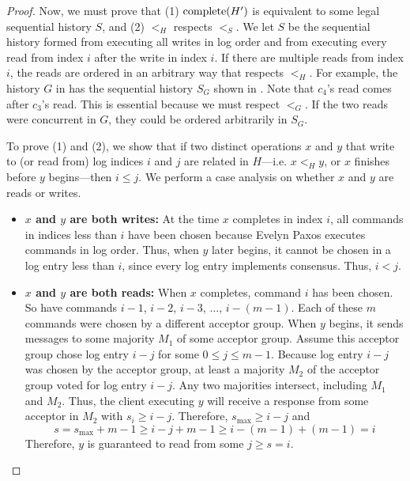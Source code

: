 \begin{proof}
  Now, we must prove that (1) $\text{complete}(H')$ is equivalent to some legal
  sequential history $S$, and (2) $<_H$ respects $<_S$. We let $S$ be the
  sequential history formed from executing all writes in log order and from
  executing every read from index $i$ after the write in index $i$.
  If there are multiple reads from index $i$, the reads are ordered in an
  arbitrary way that respects $<_H$. For example, the history $G$ in
   has the sequential history $S_G$ shown in
  . Note that $c_4$'s read comes after $c_3$'s read. This is
  essential because we must respect $<_G$. If the two reads were concurrent in
  $G$, they could be ordered arbitrarily in $S_G$.

  {}

  To prove (1) and (2), we show that if two distinct operations $x$ and $y$
  that write to (or read from) log indices $i$ and $j$ are related in
  $H$---i.e. $x <_H y$, or $x$ finishes before $y$ begins---then $i \leq j$. We
  perform a case analysis on whether $x$ and $y$ are reads or writes.

  \begin{itemize}
    \item \textbf{$x$ and $y$ are both writes:}
      At the time $x$ completes in index $i$, all commands in indices less than
      $i$ have been chosen because Evelyn Paxos executes commands in log order.
      Thus, when $y$ later begins, it cannot be chosen in a log entry less than
      $i$, since every log entry implements consensus. Thus, $i < j$.

    \item \textbf{$x$ and $y$ are both reads:}
      When $x$ completes, command $i$ has been chosen. So have commands $i-1$,
      $i-2$, $i-3$, $\ldots$, $i-(m-1)$. Each of these $m$ commands were chosen
      by a different acceptor group.
      When $y$ begins, it sends  messages to some majority
      $M_1$ of some acceptor group. Assume this acceptor group chose log entry
      $i - j$ for some $0 \leq j \leq m-1$.  Because log entry $i-j$ was chosen
      by the acceptor group, at least a majority $M_2$ of the acceptor group
      voted for log entry $i-j$.  Any two majorities intersect, including $M_1$
      and $M_2$.  Thus, the client executing $y$ will receive a
       response from some acceptor in $M_2$ with $s_i \geq
      i-j$. Therefore, $s_\text{max} \geq i - j$ and
      \[
        s = s_\text{max} + m - 1
          \geq i - j + m - 1
          \geq i - (m-1) + (m - 1)
          = i
      \]
      Therefore, $y$ is guaranteed to read from some $j \geq s = i$.


\end{itemize}
\end{proof}
